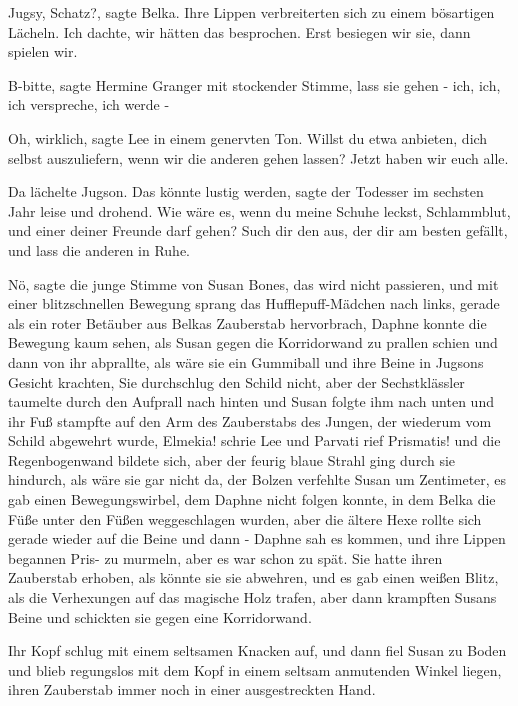 \glqq Jugsy, Schatz?\grqq{}, sagte Belka. Ihre Lippen verbreiterten sich zu einem bösartigen Lächeln. \glqq Ich dachte, wir hätten das besprochen. Erst besiegen wir sie, dann spielen wir.\grqq{}

\glqq B-bitte\grqq{}, sagte Hermine Granger mit stockender Stimme, \glqq lass sie gehen - ich, ich, ich verspreche, ich werde -\grqq{}

\glqq Oh, wirklich\grqq{}, sagte Lee in einem genervten Ton. \glqq Willst du etwa anbieten, dich selbst auszuliefern, wenn wir die anderen gehen lassen? Jetzt haben wir euch alle.\grqq{}

Da lächelte Jugson. \glqq Das könnte lustig werden\grqq{}, sagte der Todesser im sechsten Jahr leise und drohend. \glqq Wie wäre es, wenn du meine Schuhe leckst, Schlammblut, und einer deiner Freunde darf gehen? Such dir den aus, der dir am besten gefällt, und lass die anderen in Ruhe.\grqq{}

\glqq Nö\grqq{}, sagte die junge Stimme von Susan Bones, \glqq das wird nicht passieren\grqq{}, und mit einer blitzschnellen Bewegung sprang das Hufflepuff-Mädchen nach links, gerade als ein roter Betäuber aus Belkas Zauberstab hervorbrach, Daphne konnte die Bewegung kaum sehen, als Susan gegen die Korridorwand zu prallen schien und dann von ihr abprallte, als wäre sie ein Gummiball und ihre Beine in Jugsons Gesicht krachten, Sie durchschlug den Schild nicht, aber der Sechstklässler taumelte durch den Aufprall nach hinten und Susan folgte ihm nach unten und ihr Fuß stampfte auf den Arm des Zauberstabs des Jungen, der wiederum vom Schild abgewehrt wurde, \glqq Elmekia! \glqq  schrie Lee und Parvati rief \glqq Prismatis! \glqq  und die Regenbogenwand bildete sich, aber der feurig blaue Strahl ging durch sie hindurch, als wäre sie gar nicht da, der Bolzen verfehlte Susan um Zentimeter, es gab einen Bewegungswirbel, dem Daphne nicht folgen konnte, in dem Belka die Füße unter den Füßen weggeschlagen wurden, aber die ältere Hexe rollte sich gerade wieder auf die Beine und dann - Daphne sah es kommen, und ihre Lippen begannen \glqq Pris-\grqq{} zu murmeln, aber es war schon zu spät. Sie hatte ihren Zauberstab erhoben, als könnte sie sie abwehren, und es gab einen weißen Blitz, als die Verhexungen auf das magische Holz trafen, aber dann krampften Susans Beine und schickten sie gegen eine Korridorwand.

Ihr Kopf schlug mit einem seltsamen Knacken auf, und dann fiel Susan zu Boden und blieb regungslos mit dem Kopf in einem seltsam anmutenden Winkel liegen, ihren Zauberstab immer noch in einer ausgestreckten Hand.


